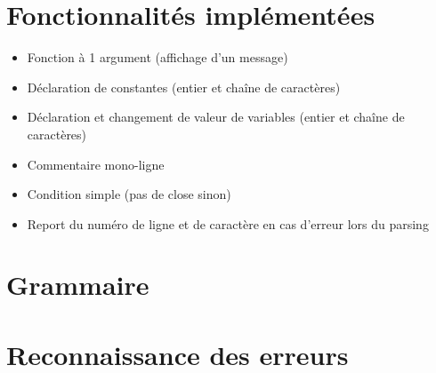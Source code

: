 \documentclass{article}
\begin{document}
	\section{Fonctionnalités implémentées}
\begin{itemize}
\item Fonction à 1 argument (affichage d'un message)
\item Déclaration de constantes (entier et chaîne de caractères)
\item Déclaration et changement de valeur de variables (entier et chaîne de caractères)
\item Commentaire mono-ligne
\item Condition simple (pas de close sinon)
\item Report du numéro de ligne et de caractère en cas d'erreur lors du parsing
\end{itemize}	
	
	\section{Grammaire}
	\section{Reconnaissance des erreurs}
	
\end{document}
